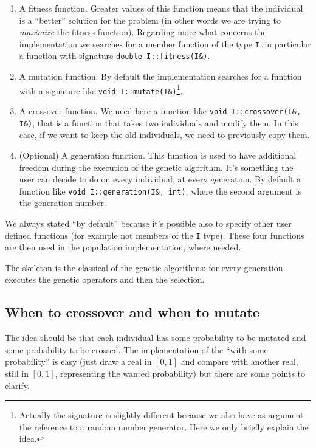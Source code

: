 \documentclass{report}
\begin{document}
\begin{enumerate}
\item A fitness function. Greater values of this function means that the individual is a ``better'' solution for the problem (in other words we are trying to \textit{maximize} the fitness function). Regarding more what concerns the implementation we searches for a member function of the type \texttt{I}, in particular a function with signature \texttt{double I::fitness(I\&)}.

\item A mutation function. By default the implementation searches for a function with a signature like \texttt{void I::mutate(I\&)}\footnote{Actually the signature is slightly different because we also have as argument the reference to a random number generator. Here we only briefly explain the idea.}.

\item A crossover function. We need here a function like \texttt{void I::crossover(I\&, I\&)}, that is a function that takes two individuals and modify them. In this case, if we want to keep the old individuals, we need to previously copy them.

\item (Optional) A generation function. This function is used to have additional freedom during the execution of the genetic algorithm. It's something the user can decide to do on every individual, at every generation. By default a function like \texttt{void I::generation(I\&, int)}, where the second argument is the generation number.
\end{enumerate}

We always stated ``by default'' because it's possible also to specify other user defined functions (for example not members of the \texttt{I} type). These four functions are then used in the population implementation, where needed.

The skeleton is the classical of the genetic algorithms: for every generation executes the genetic operators and then the selection.

\subsection{When to crossover and when to mutate}

The idea should be that each individual has some probability to be mutated and some probability to be crossed. The implementation of the ``with some probability'' is easy (just draw a real in $[0,1]$ and compare with another real, still in $[0,1]$, representing the wanted probability) but there are some points to clarify.
\end{document}
